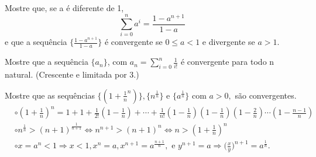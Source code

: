 \documentclass[Analysis/analysis_notes.tex]{subfiles}
\begin{document}
\begin{example}
	Mostre que, se a \'e diferente de 1,
	$$
		\sum\limits_{i=0}^{n}a^{i} = \frac{1-a^{n+1}}{1-a}
	$$
	e que a sequ\^encia $\biggl\{\frac{1-a^{n+1}}{1-a}\biggr\}$ \'e convergente se $0\leq{a}<1$ e divergente se $a > 1$.
\end{example}
\begin{example}
	Mostre que a sequ\^encia $\{a_{n}\}$, com $a_{n} = \displaystyle \sum\limits_{i=0}^{n}\frac{1}{i!}$ \'e convergente para todo n natural. (Crescente e limitada por 3.)
\end{example}
\begin{example}
	Mostre que as sequ\^encias $\biggl\{(1+\frac{1}{n}^{n})\biggr\}, \{n^{\frac{1}{n}}\}$ e $\{a^{\frac{1}{n}}\}$ com $a >0,$ s\~ao
	convergentes.
	\begin{align*}
		 & \circ (1+\frac{1}{n})^{n} = 1 + 1 + \frac{1}{2!}(1-\frac{1}{n}) + \cdots + \frac{1}{n!}(1-\frac{1}{n})(1-\frac{1}{n})(1-\frac{2}{n})\cdots(1-\frac{n-1}{n})        \\
		 & \circ n^{\frac{1}{n}} > (n+1)^{\frac{1}{n+1}}\Longleftrightarrow n^{n+1} > (n+1)^{n}\Longleftrightarrow n>(1+\frac{1}{n})^{n}                                      \\
		 & \circ x = a^{n} < 1\Rightarrow x < 1, x^{n} = a, x^{n+1} = a^{\frac{n+1}{n}},\text{ e } y^{n+1} = a \Rightarrow \biggl(\frac{x}{y}\biggr)^{n+1} = a^{\frac{1}{n}}.
	\end{align*}
\end{example}
\end{document}
